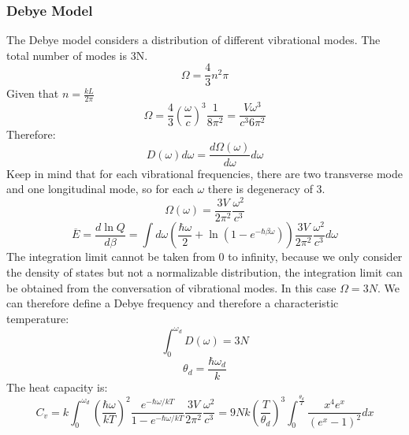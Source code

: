 \documentclass[12pt, oneside]{article}   	%
\begin{document}
\subsubsection*{Debye Model} 
\par 
The Debye model considers a distribution of different vibrational modes. The total number of modes is 3N. 
$$\Omega  = \frac{4}{3} n^2 \pi$$
Given that $n = \frac{k L}{2 \pi}$
$$\Omega = \frac{4}{3}(\frac{ \omega} {c})^3 \frac{1}{8 \pi^2} = \frac{V \omega^3}{c^3 6 \pi^2}$$
Therefore:
$$D(\omega) d\omega = \frac{d \Omega(\omega)}{d\omega} d \omega $$
Keep in mind that for each vibrational frequencies, there are two transverse mode and one longitudinal mode, so for each $\omega$ there is degeneracy of 3. 
$$\Omega(\omega) = \frac{3V}{2 \pi^2} \frac{\omega^2}{c^3} $$
$$\overline{E} = \frac{d \ln Q}{d \beta} = \int d \omega (\frac{\hbar \omega}{ 2}  + \ln (1 - e^{- \hbar \beta \omega}))  \frac{3V}{2 \pi^2} \frac{\omega^2}{c^3}  d\omega$$
The integration limit cannot be taken from 0 to infinity, because we only consider the density of states but not a normalizable distribution, the integration limit can be obtained from the conversation of vibrational modes. In this case $\Omega = 3N$. We can therefore define a Debye frequency and therefore a characteristic temperature:
$$\int_0^{\omega_d} D(\omega) = 3N$$
$$\theta_d = \frac{\hbar \omega_d}{ k}$$
The heat capacity is: 
$$C_v = k \int_0^{\omega_d} (\frac{\hbar \omega}{k T})^2 \frac{e^{- \hbar \omega / kT}}{1 - e^{- \hbar \omega / kT}} \frac{3V}{2 \pi^2} \frac{\omega^2}{c^3} = 9 N k (\frac{T}{\theta_d})^3 \int_0^{\frac{\theta_d}{T}} \frac{x^4 e^x}{(e^x -1)^2} dx$$









\end{document}
